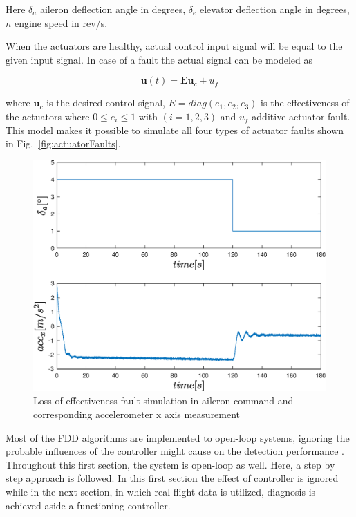 Here $ \delta_{a}$ aileron deflection angle in degrees, $ \delta_{e}$ elevator deflection angle in degrees, $n$ engine speed in rev/s. 

When the actuators are healthy, actual control input signal will be equal to the given input signal. In case of a fault the actual signal can be modeled as

\begin{equation}
\bm{u}\left(t\right)= \bm{E}\bm{u}_c + u_f
\end{equation}

where $\bm{u}_c $ is the desired control signal, $E = diag(e_1, e_2, e_3)$ is the effectiveness of the actuators where $0 \leq e_i \leq 1 $ with $(i = 1, 2 ,3)$ and $u_f$ additive actuator fault. 
This model makes it possible to simulate all four types of actuator faults shown in Fig.~\ref{fig:actuatorFaults}.

\begin{figure}
\begin{center}
\includegraphics[width=12cm]{figures/control_input_acc_x}    %
\caption{Loss of effectiveness fault simulation in aileron command and corresponding accelerometer x axis measurement} 
\label{fig:faultSimulation}
\end{center}
\end{figure}

Most of the FDD algorithms are implemented to open-loop systems, ignoring the probable influences of the controller might cause on the detection performance \cite{pandita2013closed}. Throughout this first section, the system is open-loop as well.  
Here, a step by step approach is followed. In this first section the effect of controller is ignored while in the next section, in which real flight data is utilized, diagnosis is achieved aside a functioning controller.

